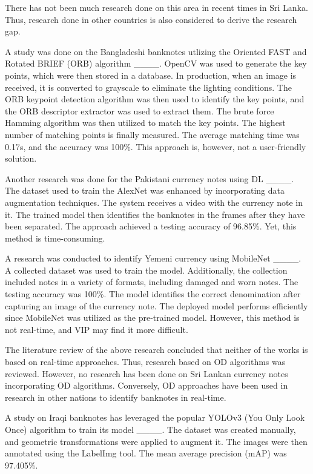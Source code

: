 There has not been much research done on this area in recent times in Sri Lanka. Thus, research done in other countries is also considered to derive the research gap.

A study was done on the Bangladeshi banknotes utlizing the Oriented FAST and Rotated BRIEF (ORB) algorithm ____. OpenCV was used to generate the key points, which were then stored in a database. In production, when an image is received, it is converted to grayscale to eliminate the lighting conditions. The ORB keypoint detection algorithm was then used to identify the key points, and the ORB descriptor extractor was used to extract them. The brute force Hamming algorithm was then utilized to match the key points. The highest number of matching points is finally measured. The average matching time was 0.17s, and the accuracy was 100\%. This approach is, however, not a user-friendly solution.

Another research was done for the Pakistani currency notes using DL ____. The dataset used to train the AlexNet was enhanced by incorporating data augmentation techniques. The system receives a video with the currency note in it. The trained model then identifies the banknotes in the frames after they have been separated. The approach achieved a testing accuracy of 96.85\%. Yet, this method is time-consuming.

A research was conducted to identify Yemeni currency using MobileNet ____. A collected dataset was used to train the model. Additionally, the collection included notes in a variety of formats, including damaged and worn notes. The testing accuracy was 100\%. The model identifies the correct denomination after capturing an image of the currency note. The deployed model performs efficiently since MobileNet was utilized as the pre-trained model. However, this method is not real-time, and VIP may find it more difficult.

The literature review of the above research concluded that neither of the works is based on real-time approaches. Thus, research based on OD algorithms was reviewed. However, no research has been done on Sri Lankan currency notes incorporating OD algorithms. Conversely, OD approaches have been used in research in other nations to identify banknotes in real-time.

A study on Iraqi banknotes has leveraged the popular YOLOv3 (You Only Look Once) algorithm to train its model ____. The dataset was created manually, and geometric transformations were applied to augment it. The images were then annotated using the LabelImg tool. The mean average precision (mAP) was 97.405\%.

